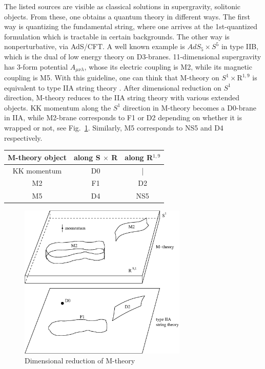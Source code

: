 \documentclass[12pt]{article}
\begin{document}
The listed sources are visible as classical solutions in supergravity, solitonic objects. 
From these, one obtains a quantum theory in different ways. 
The first way is quantizing the fundamental string, where one arrives at the 1st-quantized formulation which is tractable in certain backgrounds.
The other way is nonperturbative, via AdS/CFT. 
A well known example is $AdS_5 \times S^5$ in type IIB, which is the dual of low energy theory on D3-branes.
11-dimensional supergravity has 3-form potential $A_{\mu\nu\lambda}$, whose its electric coupling is M2, 
while its magnetic coupling is M5. 
With this guideline, one can think that M-theory on $S^1 \times {\mathrm R}^{1,9}$ is equivalent to type IIA string theory \cite{Townsend:1996xj}. 
After dimensional reduction on $S^1$ direction, M-theory reduces to the IIA string theory with various extended objects. 
KK momentum along the $S^1$ direction in M-theory becomes a D0-brane in IIA, 
while M2-brane corresponds to F1 or D2 depending on whether it is wrapped or not,
see Fig.~\ref{Mreduction}. Similarly, M5 corresponds to NS5 and D4 respectively. 
\begin{center}
\begin{tabular}{|c|c|c|}
\hline
\textbf{M-theory object}    &  along S $\times$ R & along R$^{1,9}$ \\
\hline
KK momentum    &  D0  &| \\
\hline
M2           & F1 & D2 \\
\hline
M5 &  D4 & NS5 \\
\hline
\end{tabular}
\end{center}
\begin{figure}
\begin{center}
\includegraphics[width=8.0cm]{R91.eps}
\end{center}
\caption{Dimensional reduction of M-theory}
\label{Mreduction}
\end{figure}
\end{document}
